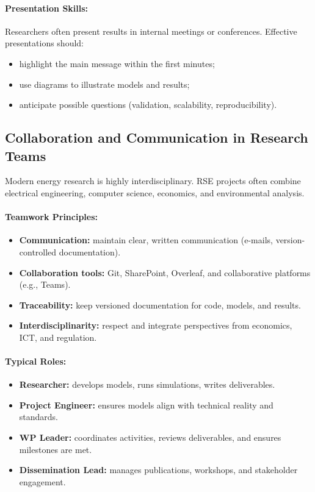 \documentclass[11pt]{article}
\begin{document}
	\paragraph{Presentation Skills:}
	Researchers often present results in internal meetings or conferences.  
	Effective presentations should:
	\begin{itemize}
		\item highlight the main message within the first minutes;
		\item use diagrams to illustrate models and results;
		\item anticipate possible questions (validation, scalability, reproducibility).
	\end{itemize}
	
	
	\subsection{Collaboration and Communication in Research Teams}
	
	Modern energy research is highly interdisciplinary.  
	RSE projects often combine electrical engineering, computer science, economics, and environmental analysis.
	
	\paragraph{Teamwork Principles:}
	\begin{itemize}
		\item \textbf{Communication:} maintain clear, written communication (e-mails, version-controlled documentation).
		\item \textbf{Collaboration tools:} Git, SharePoint, Overleaf, and collaborative platforms (e.g., Teams).
		\item \textbf{Traceability:} keep versioned documentation for code, models, and results.
		\item \textbf{Interdisciplinarity:} respect and integrate perspectives from economics, ICT, and regulation.
	\end{itemize}
	
	\paragraph{Typical Roles:}
	\begin{itemize}
		\item \textbf{Researcher:} develops models, runs simulations, writes deliverables.
		\item \textbf{Project Engineer:} ensures models align with technical reality and standards.
		\item \textbf{WP Leader:} coordinates activities, reviews deliverables, and ensures milestones are met.
		\item \textbf{Dissemination Lead:} manages publications, workshops, and stakeholder engagement.
	\end{itemize}
	
\end{document}
